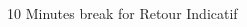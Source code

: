 \begin{frame}{}

  \begin{columns}
    \begin{column}{.5\textwidth}
      
    \end{column}
    \begin{column}{.5\textwidth}
      
    \end{column}       
  \end{columns}
\end{frame}


\begin{frame}{10 Minutes break for Retour Indicatif}

  \begin{columns}
    \begin{column}{.5\textwidth}
      \begin{displaymath}
 \end{displaymath}
    \end{column}
    \begin{column}{.5\textwidth}
      
    \end{column}       
  \end{columns}
\end{frame}

